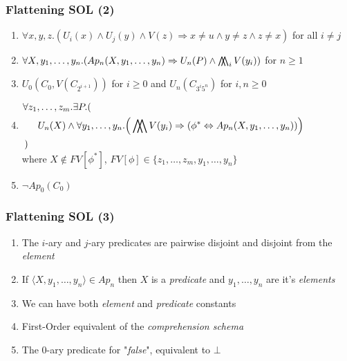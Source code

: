 \documentclass{beamer}
\newcommand{\bigdoublewedge}{
  \mathop{
    \mathchoice{\bigwedge\mkern-15mu\bigwedge}
               {\bigwedge\mkern-12.5mu\bigwedge}
               {\bigwedge\mkern-12.5mu\bigwedge}
               {\bigwedge\mkern-11mu\bigwedge}
    }
}
\begin{document}
                \begin{frame}
                    \frametitle{Flattening SOL (2)}
                    \begin{enumerate}
                        \item $ \forall x, y, z.(U_i(x) \wedge U_j(y) \wedge V(z) \Rightarrow x \neq u \wedge y \neq z \wedge z \neq x) $ for all $ i \neq j $
                        \item $ \forall X, y_1, \dots, y_n.(Ap_n(X, y_1, \dots, y_n) \Rightarrow U_n(P) \wedge \bigdoublewedge_i V(y_i)) $ for $ n \geq 1 $
                        \item $ U_0(C_0, V(C_{2^{i + 1}})) $ for $ i \geq 0 $ and $ U_n(C_{3^i5^n}) $ for $ i, n \geq 0 $
                        \item $ \begin{aligned}
                            \forall &z_1, \dots, z_m. \exists P.(\\
                            &\quad U_n(X) \wedge \forall y_1, \dots, y_n. \Big (\bigdoublewedge V(y_i) \Rightarrow (\phi^* \Leftrightarrow Ap_n(X, y_1, \dots, y_n))\Big )\\
                            ) \end{aligned} $ \\[-1\baselineskip]\quad where $ X \not\in FV[\phi^*] $, $ FV[\phi] \in \{ z_1, \dots, z_m, y_1, \dots, y_n \} $
                        \item $ \neg Ap_0(C_0) $
                    \end{enumerate}
                \end{frame}

                \begin{frame}
                    \frametitle{Flattening SOL (3)}
                    \begin{enumerate}
                        \item The $ i $-ary and $ j $-ary predicates are pairwise disjoint and disjoint from the \textit{element}
                        \item If $ \langle X, y_1, \dots, y_n \rangle \in Ap_n $ then $ X $ is a \textit{predicate} and $ y_1, \dots, y_n $ are it's \textit{elements}
                        \item We can have both \textit{element} and \textit{predicate} constants
                        \item First-Order equivalent of the \textit{comprehension schema}
                        \item The 0-ary predicate for "\textit{false}", equivalent to $ \bot $
                    \end{enumerate}
                \end{frame}
\end{document}
